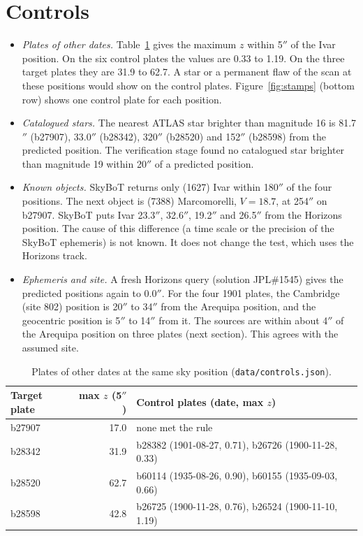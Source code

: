 \documentclass[11pt]{article}
\newcommand{\as}{$''$}
\begin{document}
\section{Controls}
\begin{itemize}
\item \emph{Plates of other dates.} Table~\ref{tab:ctrl} gives the maximum $z$ within 5\as{} of the Ivar position. On the six control plates the values are 0.33 to 1.19. On the three target plates they are 31.9 to 62.7. A star or a permanent flaw of the scan at these positions would show on the control plates. Figure~\ref{fig:stamps} (bottom row) shows one control plate for each position.
\item \emph{Catalogued stars.} The nearest ATLAS star brighter than magnitude 16 is 81.7\as{} (b27907), 33.0\as{} (b28342), 320\as{} (b28520) and 152\as{} (b28598) from the predicted position. The verification stage found no catalogued star brighter than magnitude 19 within 20\as{} of a predicted position.
\item \emph{Known objects.} SkyBoT returns only (1627) Ivar within 180\as{} of the four positions. The next object is (7388) Marcomorelli, $V=18.7$, at 254\as{} on b27907. SkyBoT puts Ivar 23.3\as, 32.6\as, 19.2\as{} and 26.5\as{} from the Horizons position. The cause of this difference (a time scale or the precision of the SkyBoT ephemeris) is not known. It does not change the test, which uses the Horizons track.
\item \emph{Ephemeris and site.} A fresh Horizons query (solution JPL\#1545) gives the predicted positions again to 0.0\as. For the four 1901 plates, the Cambridge (site 802) position is 20\as{} to 34\as{} from the Arequipa position, and the geocentric position is 5\as{} to 14\as{} from it. The sources are within about 4\as{} of the Arequipa position on three plates (next section). This agrees with the assumed site.
\end{itemize}

\begin{table}[h]
\centering\small
\begin{tabular}{lrll}\toprule
Target plate & max $z$ (5\as) & Control plates (date, max $z$) \\\midrule
b27907 & 17.0 & none met the rule \\
b28342 & 31.9 & b28382 (1901-08-27, 0.71), b26726 (1900-11-28, 0.33) \\
b28520 & 62.7 & b60114 (1935-08-26, 0.90), b60155 (1935-09-03, 0.66) \\
b28598 & 42.8 & b26725 (1900-11-28, 0.76), b26524 (1900-11-10, 1.19) \\\bottomrule
\end{tabular}
\caption{Plates of other dates at the same sky position (\texttt{data/controls.json}).}
\label{tab:ctrl}
\end{table}
\end{document}
